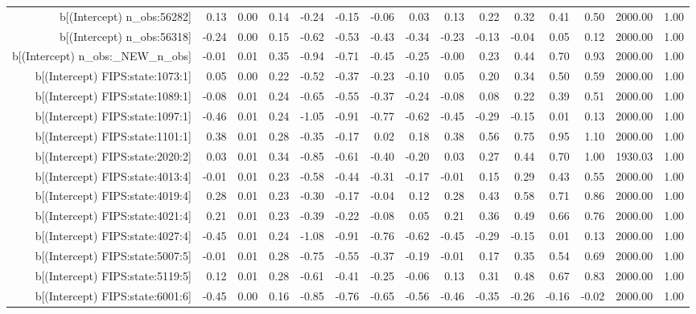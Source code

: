 \begin{table}[ht]
\begin{tabular}{rrrrrrrrrrrrrrr}
  b[(Intercept) n\_obs:56282] & 0.13 & 0.00 & 0.14 & -0.24 & -0.15 & -0.06 & 0.03 & 0.13 & 0.22 & 0.32 & 0.41 & 0.50 & 2000.00 & 1.00 \\ 
  b[(Intercept) n\_obs:56318] & -0.24 & 0.00 & 0.15 & -0.62 & -0.53 & -0.43 & -0.34 & -0.23 & -0.13 & -0.04 & 0.05 & 0.12 & 2000.00 & 1.00 \\ 
  b[(Intercept) n\_obs:\_NEW\_n\_obs] & -0.01 & 0.01 & 0.35 & -0.94 & -0.71 & -0.45 & -0.25 & -0.00 & 0.23 & 0.44 & 0.70 & 0.93 & 2000.00 & 1.00 \\ 
  b[(Intercept) FIPS:state:1073:1] & 0.05 & 0.00 & 0.22 & -0.52 & -0.37 & -0.23 & -0.10 & 0.05 & 0.20 & 0.34 & 0.50 & 0.59 & 2000.00 & 1.00 \\ 
  b[(Intercept) FIPS:state:1089:1] & -0.08 & 0.01 & 0.24 & -0.65 & -0.55 & -0.37 & -0.24 & -0.08 & 0.08 & 0.22 & 0.39 & 0.51 & 2000.00 & 1.00 \\ 
  b[(Intercept) FIPS:state:1097:1] & -0.46 & 0.01 & 0.24 & -1.05 & -0.91 & -0.77 & -0.62 & -0.45 & -0.29 & -0.15 & 0.01 & 0.13 & 2000.00 & 1.00 \\ 
  b[(Intercept) FIPS:state:1101:1] & 0.38 & 0.01 & 0.28 & -0.35 & -0.17 & 0.02 & 0.18 & 0.38 & 0.56 & 0.75 & 0.95 & 1.10 & 2000.00 & 1.00 \\ 
  b[(Intercept) FIPS:state:2020:2] & 0.03 & 0.01 & 0.34 & -0.85 & -0.61 & -0.40 & -0.20 & 0.03 & 0.27 & 0.44 & 0.70 & 1.00 & 1930.03 & 1.00 \\ 
  b[(Intercept) FIPS:state:4013:4] & -0.01 & 0.01 & 0.23 & -0.58 & -0.44 & -0.31 & -0.17 & -0.01 & 0.15 & 0.29 & 0.43 & 0.55 & 2000.00 & 1.00 \\ 
  b[(Intercept) FIPS:state:4019:4] & 0.28 & 0.01 & 0.23 & -0.30 & -0.17 & -0.04 & 0.12 & 0.28 & 0.43 & 0.58 & 0.71 & 0.86 & 2000.00 & 1.00 \\ 
  b[(Intercept) FIPS:state:4021:4] & 0.21 & 0.01 & 0.23 & -0.39 & -0.22 & -0.08 & 0.05 & 0.21 & 0.36 & 0.49 & 0.66 & 0.76 & 2000.00 & 1.00 \\ 
  b[(Intercept) FIPS:state:4027:4] & -0.45 & 0.01 & 0.24 & -1.08 & -0.91 & -0.76 & -0.62 & -0.45 & -0.29 & -0.15 & 0.01 & 0.13 & 2000.00 & 1.00 \\ 
  b[(Intercept) FIPS:state:5007:5] & -0.01 & 0.01 & 0.28 & -0.75 & -0.55 & -0.37 & -0.19 & -0.01 & 0.17 & 0.35 & 0.54 & 0.69 & 2000.00 & 1.00 \\ 
  b[(Intercept) FIPS:state:5119:5] & 0.12 & 0.01 & 0.28 & -0.61 & -0.41 & -0.25 & -0.06 & 0.13 & 0.31 & 0.48 & 0.67 & 0.83 & 2000.00 & 1.00 \\ 
  b[(Intercept) FIPS:state:6001:6] & -0.45 & 0.00 & 0.16 & -0.85 & -0.76 & -0.65 & -0.56 & -0.46 & -0.35 & -0.26 & -0.16 & -0.02 & 2000.00 & 1.00 \\ 

\end{tabular}
\end{table}
